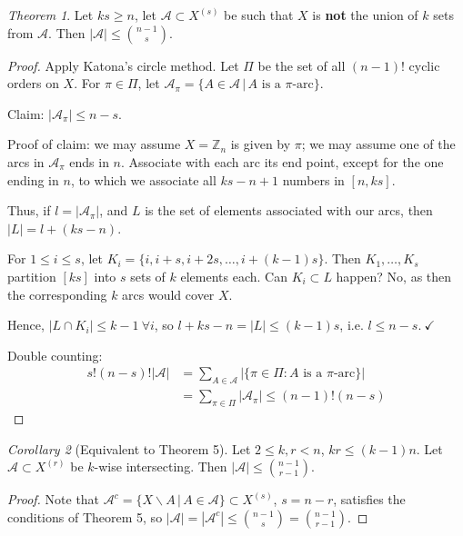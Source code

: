 \documentclass[a4paper]{article}
\theoremstyle{definition}
\theoremstyle{remark}
\theoremstyle{default}
\newtheorem{theorem}{Theorem}
\newtheorem{corollary}[theorem]{Corollary}
\newcommand*\abs[1]{\left|#1\right|}
\begin{document}
\begin{theorem}
	Let $ks \geq n$,
	let $\mathcal{A} \subset X^{(s)}$ be such that $X$ is \textbf{not} the union of $k$ sets from $\mathcal{A}$.
	Then $\abs{\mathcal{A}} \leq {n-1 \choose s}$.
\end{theorem}
\begin{proof}
	Apply Katona's circle method.
	Let $\Pi$ be the set of all $(n-1)!$ cyclic orders on $X$.
	For $\pi \in \Pi$, let $\mathcal{A}_\pi = \{A \in \mathcal{A} \,|\, A \text{ is a $\pi$-arc}\}$.
	
	Claim: $\abs{\mathcal{A}_\pi} \leq n-s$.
	
	Proof of claim: we may assume $X = \mathbb{Z}_n$ is given by $\pi$;
	we may assume one of the arcs in $\mathcal{A}_\pi$ ends in $n$.
	Associate with each arc its end point,
	except for the one ending in $n$,
	to which we associate all $ks-n+1$ numbers in $[n, ks]$.
	
	Thus, if $l = \abs{\mathcal{A}_\pi}$,
	and $L$ is the set of elements associated with our arcs,
	then $\abs{L} = l+(ks-n)$.
	
	For $1 \leq i \leq s$, let $K_i = \{i, i+s, i+2s, \dots, i+(k-1)s\}$.
	Then $K_1, \dots, K_s$ partition $[ks]$ into $s$ sets of $k$ elements each.
	Can $K_i \subset L$ happen?
	No, as then the corresponding $k$ arcs would cover $X$.
	
	Hence, $\abs{L \cap K_i} \leq k-1 \ \forall i$,
	so $l+ks-n = \abs{L} \leq (k-1)s$,
	i.e. $l \leq n-s.\ \checkmark$
	
	Double counting:
	\begin{align*}
		s!(n-s)!\abs{\mathcal{A}} &= \sum_{A \in \mathcal{A}} \abs{\{\pi \in \Pi: A \text{ is a $\pi$-arc} \}} \\
		&= \sum_{\pi \in \Pi} \abs{\mathcal{A}_\pi} \leq (n-1)!(n-s)
	\end{align*}
\end{proof}

\begin{corollary}[Equivalent to Theorem 5]
	Let $2 \leq k,r < n$, $kr \leq (k-1)n$.
	Let $\mathcal{A} \subset X^{(r)}$ be $k$-wise intersecting.
	Then $\abs{\mathcal{A}} \leq {n-1 \choose r-1}$.
\end{corollary}
\begin{proof}
	Note that $\mathcal{A}^c = \{X \backslash A \,|\, A \in \mathcal{A}\} \subset X^{(s)}$,
	$s= n-r$, satisfies the conditions of Theorem 5,
	so $\abs{\mathcal{A}} = \abs{\mathcal{A}^c} \leq {n-1 \choose s} = {n-1 \choose r-1}$.
\end{proof}
\end{document}
